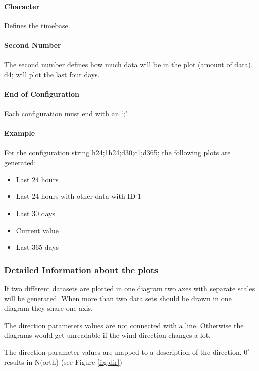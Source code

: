 \paragraph{Character} %
\label{par:character}
Defines the timebase.
\paragraph{Second Number} %
\label{par:number}
The second number defines how much data will be in the plot (amount of data). {\C d4;} will plot the last four days.
\paragraph{End of Configuration} %
\label{par:end_of_configuration}
Each configuration must end with an {\C `;'}.

\paragraph{Example} %
\label{par:example}
For the configuration string {\C h24;1h24;d30;c1;d365;} the following plots are generated:
\begin{itemize}
	\item Last 24 hours
	\item Last 24 hours with other data with ID 1 
	\item Last 30 days
	\item Current value
	\item Last 365 days
\end{itemize}


\subsubsection{Detailed Information about the plots} %
\label{ssub:detailed_information_about_the_plots}
If two different datasets are plotted in one diagram two axes with separate scales will be generated. When more than two data sets should be drawn in one diagram they share one axis.

The direction parameters values are not connected with a line. Otherwise the diagrams would get unreadable if the wind direction changes a lot.

The direction parameter values are mapped to a description of the direction. $0^\circ$ results in N(orth) (see Figure \ref{fig:dir})

